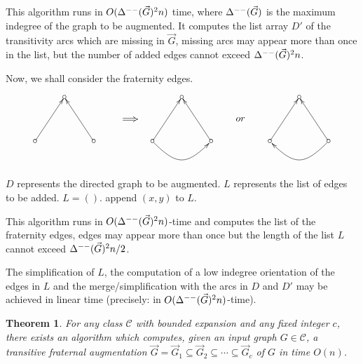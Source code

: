 \documentclass[a4paper]{amsart}
\newtheorem{theorem}{Theorem}[section]
\theoremstyle{definition}
\theoremstyle{remark}
\DeclareMathOperator\md{\Delta^{\rm --}}
\def\vG{\vec{G}}
\begin{document}
This algorithm runs in $O(\md(\vG)^2n)$ time, where $\md(\vG)$ is the
maximum indegree of the graph to be augmented. It computes the list
array $D'$ of
the transitivity arcs which are missing in $\vG$, missing arcs
may appear more than once in the list, but the number of added edges
cannot exceed $\md(\vG)^2n$.

Now, we shall consider the fraternity edges.

$$
\begin{xy}<15pt,0cm>:
(0,0)*[o]{\circ{}}="va",
(4,0)*[o]{\circ{}}="vb",
(2,3)*[o]{\circ{}}="vc",
(6,1.5)="a",
(7,1.5)="b",
(8,0)*[o]{\circ{}}="wa",
(12,0)*[o]{\circ{}}="wb",
(10,3)*[o]{\circ{}}="wc",
(14,1.5)*+{or},
(16,0)*[o]{\circ{}}="za",
(20,0)*[o]{\circ{}}="zb",
(18,3)*[o]{\circ{}}="zc"
\ar@{=>} "a";"b"
\ar@{->} "va";"vc"
\ar@{->} "vb";"vc"
\ar@{->} "wa";"wc"
\ar@{->} "wb";"wc"
\ar@{->}@(dr,dl) "wa";"wb" 
\ar@{->} "za";"zc"
\ar@{->} "zb";"zc"
\ar@{->}@(dl,dr) "zb";"za" 
\end{xy}
$$



\vspace{5mm}
\begin{algorithmic}
\REQUIRE $D$ represents the directed graph to be augmented.
\ENSURE $L$ represents the list of edges to be added.
\STATE $L=()$.
\STATE append $(x,y)$ to $L$.
\ENDIF
\ENDFOR
\ENDFOR
\ENDFOR
\end{algorithmic}
\vspace{5mm}

This algorithm runs in $O(\md(\vG)^2n)$-time and computes the list of
the fraternity edges, edges may appear more than once but the length of the
list $L$ cannot exceed $\md(\vG)^2n/2$.

The simplification of $L$, the computation of a low indegree orientation
of the edges in $L$ and the merge/simplification with the arcs in $D$ and $D'$
may be achieved in linear time (precisely: in $O(\md(\vG)^2 n)$-time).
\begin{theorem}
\label{th:augmlin}
For any class $\mathcal C$ with bounded expansion and any fixed 
integer $c$,
there exists an algorithm which computes, given an input graph
$G\in\mathcal C$, a
transitive fraternal augmentation
$\vG=\vG_1\subseteq\vG_2\subseteq\dotsb\subseteq \vG_c$ of $G$ in time
$O(n)$.
\end{theorem}
\end{document}
